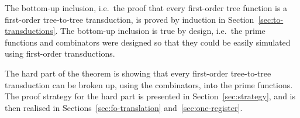 The bottom-up inclusion, i.e.~the proof that every first-order tree function is a first-order tree-to-tree transduction, is proved by induction in Section~\ref{sec:to-transductions}.  The bottom-up inclusion is true by design, i.e.~the prime functions and combinators were designed so that they could be easily  simulated using first-order transductions. 

The hard part of the theorem is showing that every first-order tree-to-tree transduction can be broken up, using the combinators, into the prime functions. The proof strategy for the hard part is presented in Section~\ref{sec:strategy}, and is then realised in Sections~\ref{sec:fo-translation} and~\ref{sec:one-register}.